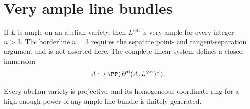 \section[Very ample line bundles]{Very ample line bundles}
\label{mumford-III17}

\begin{theorem}
\label{mumford-thm-high-power-very-ample}
If $L$ is ample on an abelian variety, then $L^{\otimes n}$ is very ample for
every integer $n>3$.  The borderline $n=3$
requires the separate point- and tangent-separation argument and is not
asserted here.  The complete linear system defines a closed immersion
\[
 A\hookrightarrow\PP(H^0(A,L^{\otimes n})^\vee).
\]
\notready
\end{theorem}

\begin{corollary}
\label{mumford-cor-abelian-projective}
Every abelian variety is projective, and its homogeneous coordinate ring for a
high enough power of any ample line bundle is finitely generated.
\notready
\end{corollary}
